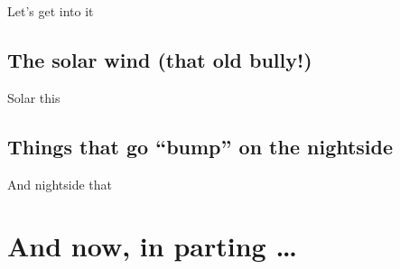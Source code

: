 


Let's get into it

\subsection{The solar wind (that old bully!)}

Solar this 

\subsection{Things that go ``bump'' on the nightside}

And nightside that 

\section{And now, in parting \dots}

\setlength\parindent{\savedparindent}
\setlength\parskip{\savedparskip}



